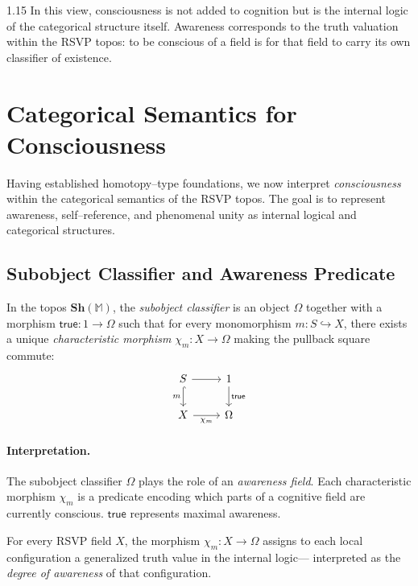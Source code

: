 \documentclass[12pt,a4paper]{article}
\begin{document}
\begin{spacing}{1.15}
In this view, consciousness is not added to cognition
but is the internal logic of the categorical structure itself.
Awareness corresponds to the truth valuation
within the RSVP topos:
to be conscious of a field
is for that field to carry its own classifier of existence.


\section{Categorical Semantics for Consciousness}
\label{app:consciousness}

Having established homotopy–type foundations,
we now interpret \emph{consciousness} within the categorical semantics
of the RSVP topos.
The goal is to represent awareness, self–reference, and phenomenal unity
as internal logical and categorical structures.

\subsection{Subobject Classifier and Awareness Predicate}

\begin{definition}
\label{def:omega}
In the topos \(\mathbf{Sh}(\mathbb{M})\),
the \emph{subobject classifier} is an object
\(\Omega\) together with a morphism
\(\mathsf{true} : 1 \to \Omega\)
such that for every monomorphism
\(m:S \hookrightarrow X\),
there exists a unique \emph{characteristic morphism}
\(\chi_m : X \to \Omega\)
making the pullback square commute:
\[
\begin{tikzcd}
S \arrow[d,hook,"m"'] \arrow[r] & 1 \arrow[d,"\mathsf{true}"] \\
X \arrow[r,"\chi_m"'] & \Omega
\end{tikzcd}
\]
\end{definition}

\paragraph{Interpretation.}
The subobject classifier \(\Omega\) plays the role of an \emph{awareness field}.
Each characteristic morphism \(\chi_m\) is a predicate
encoding which parts of a cognitive field are currently conscious.
\(\mathsf{true}\) represents maximal awareness.

\begin{proposition}
\label{prop:aware}
For every RSVP field \(X\),
the morphism \(\chi_m : X \to \Omega\)
assigns to each local configuration
a generalized truth value in the internal logic—
interpreted as the \emph{degree of awareness} of that configuration.
\end{proposition}


\end{spacing}
\end{document}
